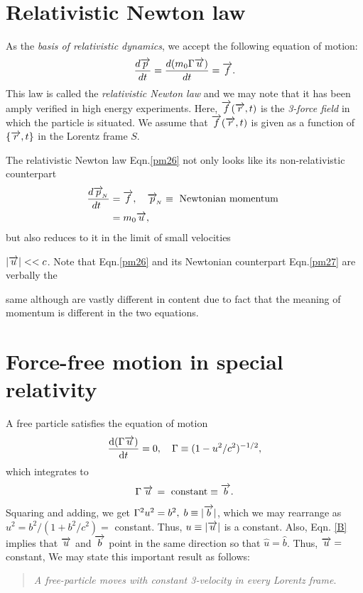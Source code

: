 \section{Relativistic Newton law}
As the \textsl{basis of relativistic dynamics}, we 
accept
the following   equation of motion:
\begin{align}\label{pm26}
\frac{d\overrightarrow{p}}{dt}=\frac{d(m_0\Gamma 
\overrightarrow{u})}{dt}=\overrightarrow{f}.
\end{align}
This law is called the \textsl{relativistic Newton law} 
and 
we may note that it has been amply verified in high 
energy 
experiments. Here, $\overrightarrow{f}(\overrightarrow{r},t) $ is the 
\textsl{3-force field} in which the particle is 
situated. We 
assume that  $ \overrightarrow{f}(\overrightarrow{r},t) $ is {given} as a 
function 
of $ \{\overrightarrow{r},t\}$ in the Lorentz frame $S$.

The relativistic Newton law Eqn.\eqref{pm26} not only
{looks} like its non-relativistic counterpart
\begin{align}\label{pm27}
\frac{d\overrightarrow{p}_{_{\hspace*{-1.5pt}{N}}}}
{\hspace*{-4pt} dt}&=\overrightarrow{f},\quad
\overrightarrow{p}_{_{\hspace*{-1.5pt}{N}}}\equiv \text{ Newtonian momentum }
\notag\\& =m_0\overrightarrow{u},
\end{align}
but also reduces to it in the limit of small velocities 
 
$|\overrightarrow{u}| << c$. Note that Eqn.\eqref{pm26} and its 
Newtonian counterpart Eqn.\eqref{pm27} are verbally the 
 
same although are  vastly different in content due to 
fact that the meaning of momentum is different in the 
two 
equations.

\section{Force-free motion in special relativity}
A free particle satisfies the equation of motion
\begin{align}\label{pm28}
\frac{\mathrm{d}{(\Gamma  \overrightarrow{u})}}{\mathrm{d}{t}}= 0, \quad \Gamma \equiv
(1-u^2/c^2)^{-1/2},
\end{align}
which integrates to
\begin{equation}\label{B}
\Gamma \, \overrightarrow{u}\, = \text{ constant}\equiv \overrightarrow{b}.
\end{equation}
Squaring and adding, we get $\Gamma^2 u^2 = b^2,
\; b\equiv |\overrightarrow{b}|$, which we may rearrange as  $u^2 
= 
b^2/(1+b^2/c^2)=$ constant. Thus,  $u \equiv|\overrightarrow{u}|$ 
is 
a constant. Also, Eqn. \eqref{B} implies that 
$\overrightarrow{u}$ and 
$\overrightarrow{b}$ point in the same direction so that $\hat{u} 
= 
\hat{b}$. Thus, $\overrightarrow{u}=$ constant, We may state 
this 
important result as follows:
\begin{quote}
\textsl{A free-particle moves with constant 3-velocity 
in  every  Lorentz frame}.
\end{quote}

